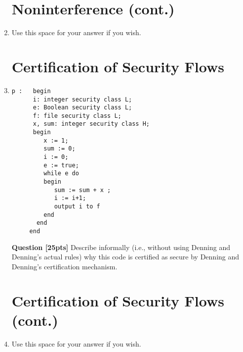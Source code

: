 \documentclass[12pt]{article}
\begin{document}
\begin{enumerate}
\newpage
\section*{Noninterference (cont.)}
\item[] Use this space for your answer if you wish.

\newpage
\section{Certification of Security Flows}
\item[]
\begin{verbatim}
p :   begin
      i: integer security class L; 
      e: Boolean security class L;
      f: file security class L;
      x, sum: integer security class H;
      begin
         x := 1;
         sum := 0; 
         i := 0;
         e := true; 
         while e do
         begin
            sum := sum + x ; 
            i := i+1;
            output i to f
         end 
       end
     end
\end{verbatim}
\begin{enumerate}
{\bf Question [25pts]} Describe informally (i.e., without using Denning and Denning's actual rules) why this code is certified as secure by Denning and Denning's certification mechanism. 
\end{enumerate}
\newpage
\section*{Certification of Security Flows (cont.)}
\item[] Use this space for your answer if you wish.
\end{enumerate}
\end{document}
